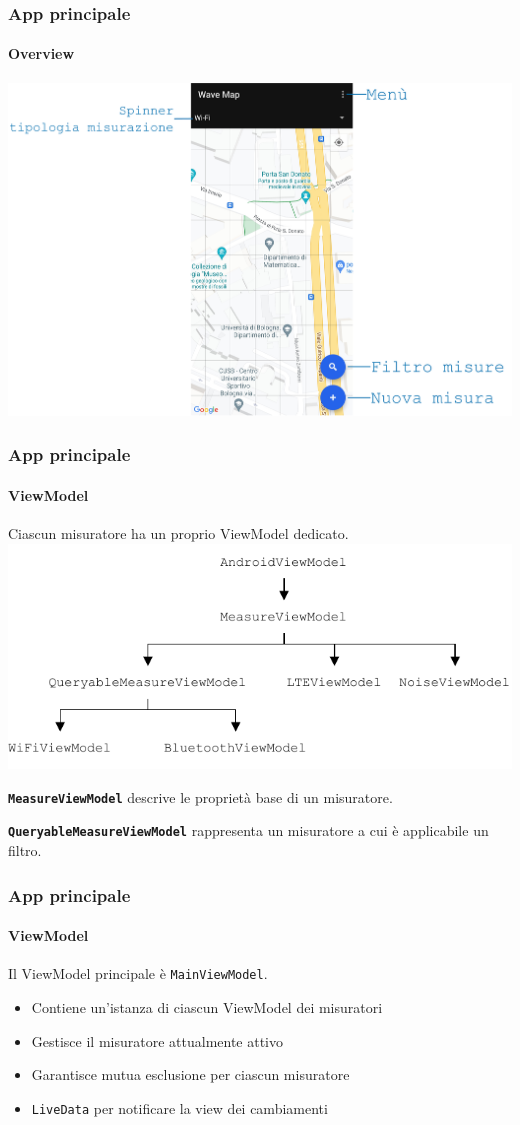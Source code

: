 \documentclass{beamer}
\begin{document}
\begin{frame}
    \frametitle{App principale}
    \framesubtitle{Overview}

    \centering
    \includegraphics[width=\linewidth]{./img/overview/main.pdf}
\end{frame}


\begin{frame}
    \frametitle{App principale}
    \framesubtitle{ViewModel}

    Ciascun misuratore ha un proprio ViewModel dedicato.
    \includegraphics[width=\linewidth]{./img/viewmodel.pdf}

    \textbf{\texttt{MeasureViewModel}} descrive le proprietà base di un misuratore.

    \textbf{\texttt{QueryableMeasureViewModel}} rappresenta un misuratore a cui è applicabile un filtro.
\end{frame}


\begin{frame}
    \frametitle{App principale}
    \framesubtitle{ViewModel}

    Il ViewModel principale è \texttt{MainViewModel}.
    \begin{itemize}
        \item Contiene un'istanza di ciascun ViewModel dei misuratori
        \item Gestisce il misuratore attualmente attivo
        \item Garantisce mutua esclusione per ciascun misuratore
        \item \texttt{LiveData} per notificare la view dei cambiamenti
    \end{itemize}
    

\end{frame}
\end{document}
